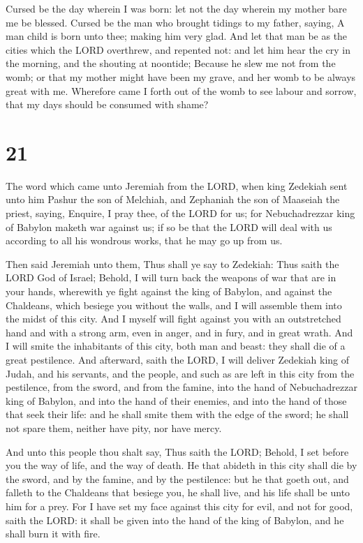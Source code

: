  Cursed be the day wherein I was born: let not the day
wherein my mother bare me be blessed.  Cursed be the man
who brought tidings to my father, saying, A man child is born unto thee;
making him very glad.  And let that man be as the cities
which the LORD overthrew, and repented not: and let him hear the cry in
the morning, and the shouting at noontide;  Because he
slew me not from the womb; or that my mother might have been my grave,
and her womb to be always great with me.  Wherefore came
I forth out of the womb to see labour and sorrow, that my days should be
consumed with shame?

\hypertarget{section-20}{%
\section{21}\label{section-20}}

 The word which came unto Jeremiah from the LORD, when
king Zedekiah sent unto him Pashur the son of Melchiah, and Zephaniah
the son of Maaseiah the priest, saying,  Enquire, I pray
thee, of the LORD for us; for Nebuchadrezzar king of Babylon maketh war
against us; if so be that the LORD will deal with us according to all
his wondrous works, that he may go up from us.

 Then said Jeremiah unto them, Thus shall ye say to
Zedekiah:  Thus saith the LORD God of Israel; Behold, I
will turn back the weapons of war that are in your hands, wherewith ye
fight against the king of Babylon, and against the Chaldeans, which
besiege you without the walls, and I will assemble them into the midst
of this city.  And I myself will fight against you with an
outstretched hand and with a strong arm, even in anger, and in fury, and
in great wrath.  And I will smite the inhabitants of this
city, both man and beast: they shall die of a great pestilence.
 And afterward, saith the LORD, I will deliver Zedekiah
king of Judah, and his servants, and the people, and such as are left in
this city from the pestilence, from the sword, and from the famine, into
the hand of Nebuchadrezzar king of Babylon, and into the hand of their
enemies, and into the hand of those that seek their life: and he shall
smite them with the edge of the sword; he shall not spare them, neither
have pity, nor have mercy.

 And unto this people thou shalt say, Thus saith the LORD;
Behold, I set before you the way of life, and the way of death.
 He that abideth in this city shall die by the sword, and
by the famine, and by the pestilence: but he that goeth out, and falleth
to the Chaldeans that besiege you, he shall live, and his life shall be
unto him for a prey.  For I have set my face against this
city for evil, and not for good, saith the LORD: it shall be given into
the hand of the king of Babylon, and he shall burn it with fire.

